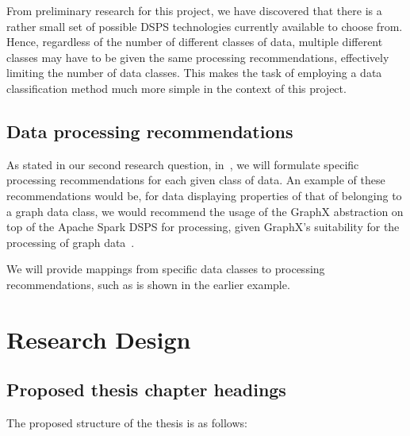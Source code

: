 \documentclass[a4paper,11pt]{article}
\begin{document}
From preliminary research for this project, we have discovered that there is a rather small set of possible DSPS
technologies currently available to choose from. Hence, regardless of the number of different classes of data, multiple
different classes may have to be given the same processing recommendations, effectively limiting the number of data
classes. This makes the task of employing a data classification method much more simple in the context of this project.


\subsection{Data processing recommendations} %
\label{sub:data_processing_recommendations}

As stated in our second research question, in~, we will formulate specific processing
recommendations for each given class of data. An example of these recommendations would be, for data displaying
properties of that of belonging to a graph data class, we would recommend the usage of the GraphX abstraction on top of
the Apache Spark DSPS for processing, given GraphX's suitability for the processing of graph
data~\cite{DBLP:journals/corr/XinCDGFS14}.

We will provide mappings from specific data classes to processing recommendations, such as is shown in the earlier example.



\section{Research Design} %
\label{sec:research_design}

\subsection{Proposed thesis chapter headings} %
\label{sub:proposed_thesis_chapter_headings}

The proposed structure of the thesis is as follows:
\end{document}
